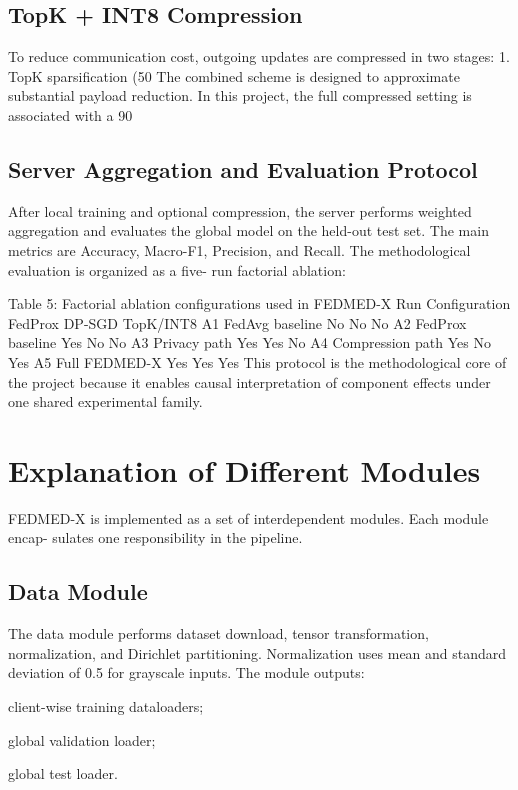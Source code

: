 \subsection{TopK + INT8 Compression}
To reduce communication cost, outgoing updates are compressed in two stages:
1. TopK sparsification (50%
The combined scheme is designed to approximate substantial payload reduction. In this project, the full compressed setting is associated with a 90%
\subsection{Server Aggregation and Evaluation Protocol}
After local training and optional compression, the server performs weighted aggregation and evaluates the global model on the held-out test set. The main metrics are Accuracy,
Macro-F1, Precision, and Recall. The methodological evaluation is organized as a five- run factorial ablation:

Table 5: Factorial ablation configurations used in FEDMED-X
Run
Configuration
FedProx
DP-SGD
TopK/INT8
A1
FedAvg baseline
No
No
No
A2
FedProx baseline
Yes
No
No
A3
Privacy path
Yes
Yes
No
A4
Compression path
Yes
No
Yes
A5
Full FEDMED-X
Yes
Yes
Yes
This protocol is the methodological core of the project because it enables causal interpretation of component effects under one shared experimental family.
\section{Explanation of Different Modules}
FEDMED-X is implemented as a set of interdependent modules. Each module encap- sulates one responsibility in the pipeline.
\subsection{Data Module}
The data module performs dataset download, tensor transformation, normalization, and Dirichlet partitioning. Normalization uses mean and standard deviation of 0.5 for grayscale inputs. The module outputs:
\item client-wise training dataloaders;
\item global validation loader;
\item global test loader.

